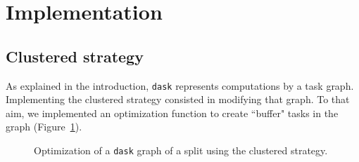 \documentclass[conference]{IEEEtran}
\begin{document}
\section{Implementation}

\subsection{Clustered strategy}

As explained in the introduction, \texttt{dask} represents computations by a task graph.
Implementing the clustered strategy consisted in modifying that graph. To that
aim, we implemented an optimization function to create ``buffer" tasks in the
graph (Figure~\ref{fig:bufferization}).

\begin{figure}
  \centering

  \qquad

  \caption{Optimization of a \texttt{dask} graph of a split using the clustered strategy.}
  \label{fig:bufferization}

\end{figure}
\end{document}
